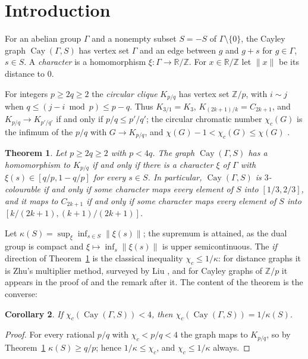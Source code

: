 \documentclass[11pt,a4paper]{amsart}
\newtheorem{theorem}{Theorem}
\newtheorem{corollary}[theorem]{Corollary}
\theoremstyle{definition}
\newcommand{\R}{\mathbb{R}}
\newcommand{\Z}{\mathbb{Z}}
\newcommand{\Cay}{\operatorname{Cay}}
\newcommand{\RZ}{\R/\Z}
\begin{document}
\maketitle

\section{Introduction}

For an abelian group $\Gamma$ and a nonempty subset $S=-S$ of $\Gamma\setminus\{0\}$, the Cayley graph $\Cay(\Gamma,S)$ has
vertex set $\Gamma$ and an edge between $g$ and $g+s$ for $g\in\Gamma$, $s\in S$. A \emph{character} is a
homomorphism $\xi:\Gamma\to\RZ$. For $x\in\RZ$ let $\|x\|$ be its distance to $0$.

For integers $p\ge2q\ge2$ the \emph{circular clique} $K_{p/q}$ has vertex set $\Z/p$, with $i\sim j$ when
$q\le(j-i\bmod p)\le p-q$. Thus $K_{3/1}=K_3$, $K_{(2k+1)/k}=C_{2k+1}$, and $K_{p/q}\to K_{p'/q'}$ if and only if
$p/q\le p'/q'$; the circular chromatic number $\chi_c(G)$ is the infimum of the $p/q$ with $G\to K_{p/q}$, and
$\chi(G)-1<\chi_c(G)\le\chi(G)$ \cite{ZhuSurvey}.

\begin{theorem}\label{thm:main}
Let $p\ge2q\ge2$ with $p<4q$. The graph $\Cay(\Gamma,S)$ has a homomorphism to $K_{p/q}$ if and only if there is a
character $\xi$ of $\Gamma$ with $\xi(s)\in[q/p,1-q/p]$ for every $s\in S$. In particular, $\Cay(\Gamma,S)$ is
$3$-colourable if and only if some character maps every element of $S$ into $[1/3,2/3]$, and it maps to $C_{2k+1}$
if and only if some character maps every element of $S$ into $[k/(2k+1),(k+1)/(2k+1)]$.
\end{theorem}

Let $\kappa(S)=\sup_\xi\inf_{s\in S}\|\xi(s)\|$; the supremum is attained, as the dual group is compact and
$\xi\mapsto\inf_s\|\xi(s)\|$ is upper semicontinuous. The \emph{if} direction of Theorem~\ref{thm:main} is the
classical inequality $\chi_c\le1/\kappa$: for distance graphs it is Zhu's multiplier method, surveyed by Liu
\cite[\S2]{Liu}, and for Cayley graphs of $\Z/p$ it appears in the proof of \cite[Theorem~3.2]{Alon} and the remark
after it. The content of the theorem
is the converse:

\begin{corollary}\label{cor:chic}
If $\chi_c(\Cay(\Gamma,S))<4$, then $\chi_c(\Cay(\Gamma,S))=1/\kappa(S)$.
\end{corollary}

\begin{proof}
For every rational $p/q$ with $\chi_c<p/q<4$ the graph maps to $K_{p/q}$, so by Theorem~\ref{thm:main}
$\kappa(S)\ge q/p$; hence $1/\kappa\le\chi_c$, and $\chi_c\le1/\kappa$ always.
\end{proof}
\end{document}
